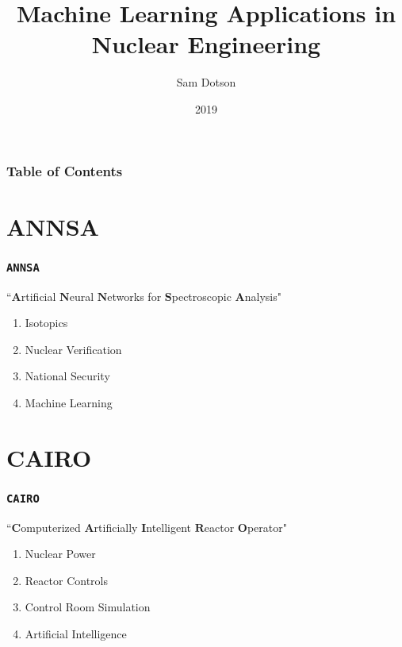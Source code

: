 \documentclass{beamer}
\title{Machine Learning Applications in Nuclear Engineering}
\author{Sam Dotson}
\institute{University of Illinois at Urbana-Champaign}
\date{2019}
\begin{document}
\frame{\titlepage}
	\begin{frame}
		\frametitle{Table of Contents}
		\tableofcontents
	\end{frame}

	\section{ANNSA}

	\begin{frame}
		\frametitle{\texttt{ANNSA}}
		``$\textbf{A}$rtificial $\textbf{N}$eural $\textbf{N}$etworks for $\textbf{S}$pectroscopic $\textbf{A}$nalysis"\\
		\begin{enumerate}
			\item Isotopics
			\item Nuclear Verification
			\item National Security 
			\item Machine Learning
		\end{enumerate}
	\end{frame}	

	\begin{frame}
		
	\end{frame}

	\section{CAIRO}

	\begin{frame}
		\frametitle{\texttt{CAIRO}}
		``$\textbf{C}$omputerized $\textbf{A}$rtificially $\textbf{I}$ntelligent $\textbf{R}$eactor $\textbf{O}$perator"\\
		\begin{enumerate}
			\item Nuclear Power
			\item Reactor Controls
			\item Control Room Simulation
			\item Artificial Intelligence
		\end{enumerate}
	\end{frame}
\end{document}
